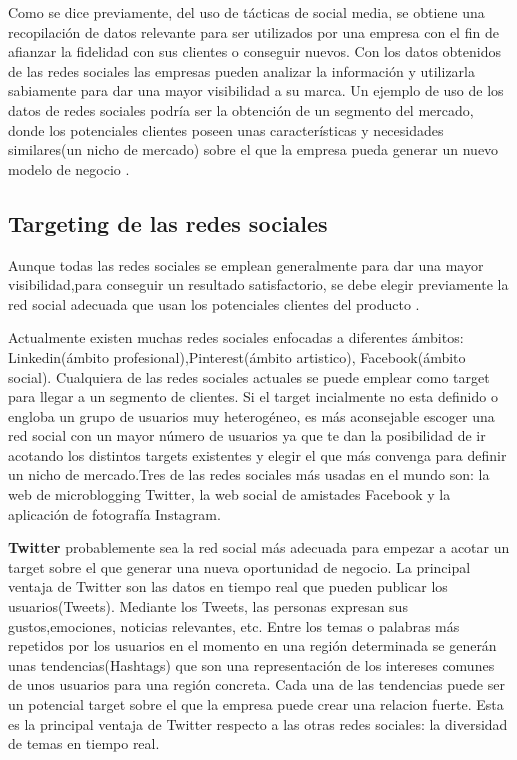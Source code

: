 Como se dice previamente, del uso de tácticas de social media, se obtiene una recopilación de datos relevante para ser utilizados por una empresa con el fin de afianzar la fidelidad con sus clientes o conseguir nuevos. Con los datos obtenidos de las redes sociales las empresas pueden analizar la información y utilizarla sabiamente para dar una mayor visibilidad a su marca. Un ejemplo de uso de los datos de redes sociales podría ser la obtención de un segmento del mercado, donde los potenciales clientes poseen unas características y necesidades similares(un nicho de mercado) sobre el que la empresa pueda generar un nuevo modelo de negocio \cite{social-media-marketing}.


\subsection{Targeting de las redes sociales}

Aunque todas las redes sociales se emplean generalmente para dar una mayor visibilidad,para conseguir un resultado satisfactorio, se debe elegir previamente la red social adecuada que usan los potenciales clientes del producto \cite{social-targetting}.

\vspace{5 mm}

Actualmente existen muchas redes sociales enfocadas a diferentes ámbitos: Linkedin(ámbito profesional),Pinterest(ámbito artistico), Facebook(ámbito social). Cualquiera de las redes sociales actuales se puede emplear como target para llegar a un segmento de clientes. Si el target incialmente no esta definido o engloba un grupo de usuarios muy heterogéneo, es más aconsejable escoger una red social con  un mayor número de usuarios ya que te dan la posibilidad de ir acotando los distintos targets existentes y elegir el que más convenga para definir un nicho de mercado.Tres de las redes sociales más usadas en el mundo son: la web de microblogging Twitter, la web social de amistades Facebook y la aplicación de fotografía Instagram.

\vspace{5 mm}

\textbf{Twitter} probablemente sea la red social más adecuada para empezar a acotar un target sobre el que generar una nueva oportunidad de negocio. La principal ventaja de Twitter son las datos en tiempo real que pueden publicar los usuarios(Tweets). Mediante los Tweets, las personas expresan sus gustos,emociones, noticias relevantes, etc. Entre los temas o palabras más repetidos por los usuarios en el momento en una región determinada se generán unas tendencias(Hashtags) que son una representación de los intereses comunes de unos usuarios para una región concreta. Cada una de las tendencias puede ser un potencial target sobre el que la empresa puede crear una relacion fuerte. Esta es la principal ventaja de Twitter respecto a las otras redes sociales: la diversidad de temas en tiempo real.


